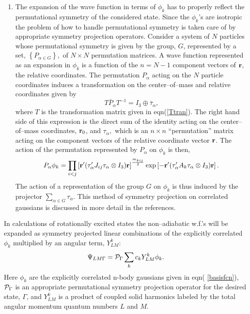 \begin{enumerate}
\item  
The expansion of the wave function in terms
of $\phi_k$ has to properly
reflect the permutational symmetry
of the considered state. 
Since the $\phi _k$'s are isotropic
the problem of 
how to handle
permutational symmetry is
taken care of by appropriate symmetry projection operators. 
Consider a system
of $N$ particles  
whose permutational symmetry is given by
the group, $G$, represented by
a set, $\left\{ P_{\alpha \in G}\right\} ,$ of $N\times N$ permutation
matrices. A wave function represented as an expansion in $\phi _k$ is a
function of the $n=N-1$ component vectors of ${\bf r}$, the relative
coordinates. The permutation $P_\alpha $ acting on the $N$ particle
coordinates induces a transformation on the center--of--mass and relative
coordinates given by 
\begin{equation}
T\bar{P}_\alpha T^{-1}=I_3\oplus \bar{\tau}_\alpha,
\end{equation}
where $T$ is the transformation matrix given in eqn(\ref{Ttran}). 
The right hand side of this 
expression is the direct sum of the identity acting on the
center--of--mass coordinates, ${\bf r}_0$, and $\tau _\alpha ,$ which is an 
$n\times n$ ``permutation'' matrix acting on the component vectors of the
relative coordinate vector ${\bf r}$. The action of the permutation
represented by $P_\alpha $ on $\phi _k$ is then, 
\begin{equation}
P_\alpha \phi _k=\prod_{i<j}\left[ {\bf r}^{\prime }(\tau _\alpha
^{\prime }J_{ij}\tau _\alpha \otimes I_3){\bf r}\right] ^{\frac{m_{kij}}%
2}\exp \left[ -{\bf r}^{\prime }(\tau _\alpha ^{\prime }A_k\tau _\alpha
\otimes I_3){\bf r}\right] .
\end{equation}
The action of a representation of the group $G$ on $\phi
_k$ is thus induced by the projector $\sum_{\alpha \in G}\tau _\alpha .$
This method of symmetry 
projection on correlated gaussians is discussed in
more detail in the 
references\cite{Kinghorn93,Kinghorn95b,Poshusta83}.


\end{enumerate}


In calculations of rotationally excited states
the non--adiabatic w.f.'s will be
expanded as symmetry projected linear combinations of the explicitly
correlated $\phi _k$ multiplied by an angular term, $Y_{LM}^k:$ 
\begin{equation}
\Psi_{LM\Gamma }={\cal P}_\Gamma \sum_k c_k Y_{LM}^k\phi_k.  \label{wf}
\label{Y1}
\end{equation}
Here $\phi_k$ are the explicitly correlated n-body gaussians given 
in eqn(%
\ref{basisfcn}), ${\cal P}_\Gamma $ is an appropriate permutational
symmetry projection operator for the desired state, 
$\Gamma $, and $Y_{LM}^k$
is a product of coupled solid harmonics labeled by the total angular
momentum quantum numbers $L$ and $M$.

